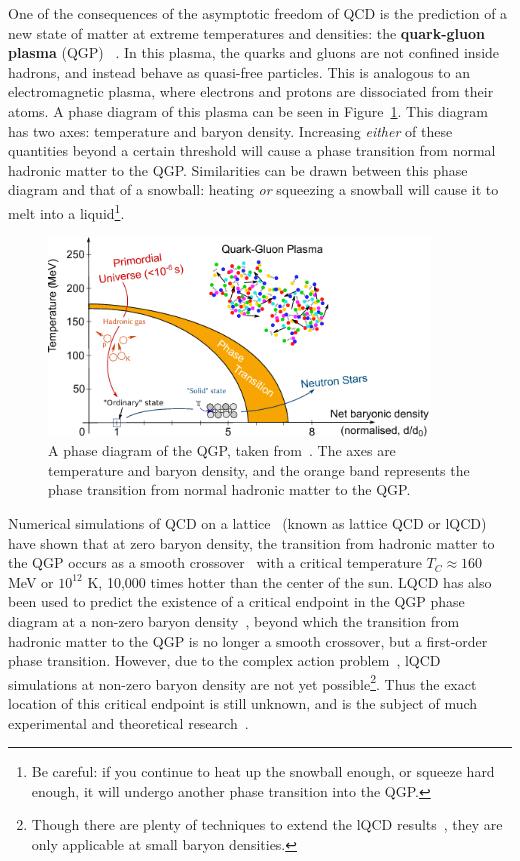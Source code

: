 One of the consequences of the asymptotic freedom of QCD is the prediction of a new state of matter at extreme temperatures and densities: the \textbf{quark-gluon plasma} (QGP) ~\cite{QGP1, QGP2}. In this plasma, the quarks and gluons are not confined inside hadrons, and instead behave as quasi-free particles. This is analogous to an electromagnetic plasma, where electrons and protons are dissociated from their atoms. A phase diagram of this plasma can be seen in Figure~\ref{fig:qgp_phase_diagram}. This diagram has two axes: temperature and baryon density. Increasing \textit{either} of these quantities beyond a certain threshold will cause a phase transition from normal hadronic matter to the QGP. Similarities can be drawn between this phase diagram and that of a snowball: heating \textit{{or}} squeezing a snowball will cause it to melt into a liquid\footnote{Be careful: if you continue to heat up the snowball enough, or squeeze hard enough, it will undergo another phase transition into the QGP.}.  

\begin{figure}
    \centering
    \includegraphics[width=0.9\textwidth]{figures/introduction/qgp_phase_diagram.png}
    \caption{A phase diagram of the QGP, taken from~\cite{QGPPhaseDiagram}. The axes are temperature and baryon density, and the orange band represents the phase transition from normal hadronic matter to the QGP.}
    \label{fig:qgp_phase_diagram}
\end{figure}

Numerical simulations of QCD on a lattice~\cite{LatticeQCD1, LatticeQCD2} (known as lattice QCD or lQCD) have shown that at zero baryon density, the transition from hadronic matter to the QGP occurs as a smooth crossover~\cite{LatticeQCD_Crossover} with a critical temperature $T_C \approx 160$ MeV or $10^{12}$ K, 10,000 times hotter than the center of the sun. LQCD has also been used to predict the existence of a critical endpoint in the QGP phase diagram at a non-zero baryon density~\cite{LatticeQCD_CriticalPoint}, beyond which the transition from hadronic matter to the QGP is no longer a smooth crossover, but a first-order phase transition. However, due to the complex action problem~\cite{ComplexActionProblem}, lQCD simulations at non-zero baryon density are not yet possible\footnote{Though there are plenty of techniques to extend the lQCD results~\cite{TaylorSeries, ComplexDensity}, they are only applicable at small baryon densities.}. Thus the exact location of this critical endpoint is still unknown, and is the subject of much experimental and theoretical research~\cite{QGP3}.

